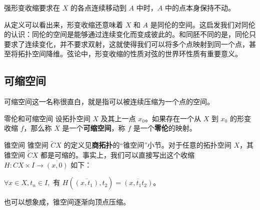 强形变收缩要求在 $X$ 的各点连续移动到 $A$ 中时，$A$ 中的点本身保持不动。

从定义可以看出来，形变收缩还意味着 $X$ 和 $A$ 是同伦的空间。这启发我们对同伦的认识：同伦的空间是能够通过连续变化而变成彼此的。和同胚不同的是，同伦只要求了连续变化，并不要求双射，这就使得我们可以将多个点映射到同一个点，甚至将拓扑空间降维。弦论中，形变收缩的性质对弦的世界环性质有重要意义。

\subsection{可缩空间}
可缩空间这一名称很直白，就是指可以被连续压缩为一个点的空间。

\begin{definition}{零伦和可缩空间}
设拓扑空间 $X$ 及其上一点 $x_0$。如果存在一个从 $X$ 到 $x_0$ 的形变收缩 $f$，那么称 $X$ 是一个\textbf{可缩空间}，称 $f$ 是一个\textbf{零伦}的映射。
\end{definition}

\begin{example}{锥空间}
锥空间 $\widetilde{C}X$ 的定义见\textbf{商拓扑}的“锥空间”小节。对于任意的拓扑空间 $X$，其锥空间 $\widetilde{C}X$ 都是可缩的。事实上，我们可以直接写出这个收缩 $H:CX\times I\rightarrow\overline{(x, 0)}$ 如下：

$\forall x\in X, t_n\in I, $ 有 $H(\overline{(x, t_1)}, t_2)=\overline{(x, t_1t_2)}$。

也可以想象成，锥空间逐渐向顶点压缩。
\end{example}


